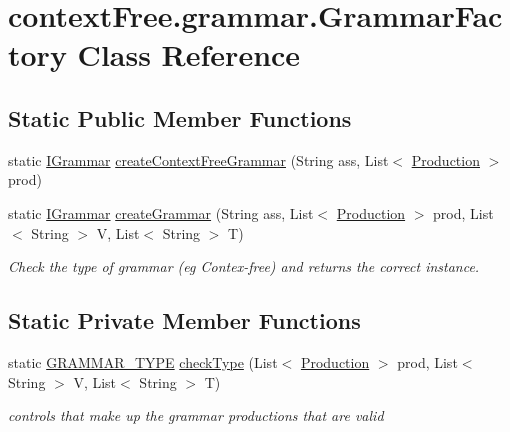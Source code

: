 \hypertarget{classcontext_free_1_1grammar_1_1_grammar_factory}{\section{context\-Free.\-grammar.\-Grammar\-Factory Class Reference}
\label{classcontext_free_1_1grammar_1_1_grammar_factory}
}
\subsection*{Static Public Member Functions}
\begin{DoxyCompactItemize}
\item 
static \hyperlink{interfacecontext_free_1_1grammar_1_1_i_grammar}{I\-Grammar} \hyperlink{classcontext_free_1_1grammar_1_1_grammar_factory_a6829a8d168584b20ac594fae87de591a}{create\-Context\-Free\-Grammar} (String ass, List$<$ \hyperlink{classcontext_free_1_1grammar_1_1_production}{Production} $>$ prod)
\item 
static \hyperlink{interfacecontext_free_1_1grammar_1_1_i_grammar}{I\-Grammar} \hyperlink{classcontext_free_1_1grammar_1_1_grammar_factory_a25d4e5bf4a9a452efca5dd6518e16c25}{create\-Grammar} (String ass, List$<$ \hyperlink{classcontext_free_1_1grammar_1_1_production}{Production} $>$ prod, List$<$ String $>$ V, List$<$ String $>$ T)
\begin{DoxyCompactList}\small\item\em Check the type of grammar (eg Contex-\/free) and returns the correct instance. \end{DoxyCompactList}\end{DoxyCompactItemize}
\subsection*{Static Private Member Functions}
\begin{DoxyCompactItemize}
\item 
static \hyperlink{enumcontext_free_1_1grammar_1_1_g_r_a_m_m_a_r___t_y_p_e}{G\-R\-A\-M\-M\-A\-R\-\_\-\-T\-Y\-P\-E} \hyperlink{classcontext_free_1_1grammar_1_1_grammar_factory_a513482168bb15e55211bc4f04e276711}{check\-Type} (List$<$ \hyperlink{classcontext_free_1_1grammar_1_1_production}{Production} $>$ prod, List$<$ String $>$ V, List$<$ String $>$ T)
\begin{DoxyCompactList}\small\item\em controls that make up the grammar productions that are valid \end{DoxyCompactList}\end{DoxyCompactItemize}


